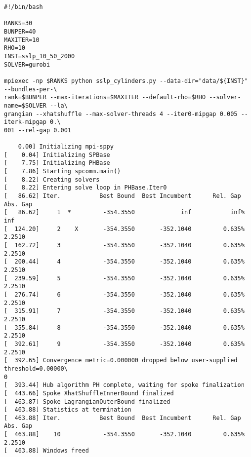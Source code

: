 \documentclass{article}
\begin{document}
\begin{verbatim}
#!/bin/bash

RANKS=30
BUNPER=40
MAXITER=10
RHO=10
INST=sslp_10_50_2000
SOLVER=gurobi

mpiexec -np $RANKS python sslp_cylinders.py --data-dir="data/${INST}" --bundles-per-\
rank=$BUNPER --max-iterations=$MAXITER --default-rho=$RHO --solver-name=$SOLVER --la\
grangian --xhatshuffle --max-solver-threads 4 --iter0-mipgap 0.005 --iterk-mipgap 0.\
001 --rel-gap 0.001

    0.00] Initializing mpi-sppy
[    0.04] Initializing SPBase
[    7.75] Initializing PHBase
[    7.86] Starting spcomm.main()
[    8.22] Creating solvers
[    8.22] Entering solve loop in PHBase.Iter0
[   86.62] Iter.           Best Bound  Best Incumbent      Rel. Gap        Abs. Gap
[   86.62]     1  *         -354.3550             inf           inf%             inf
[  124.20]     2    X       -354.3550       -352.1040         0.635%          2.2510
[  162.72]     3            -354.3550       -352.1040         0.635%          2.2510
[  200.44]     4            -354.3550       -352.1040         0.635%          2.2510
[  239.59]     5            -354.3550       -352.1040         0.635%          2.2510
[  276.74]     6            -354.3550       -352.1040         0.635%          2.2510
[  315.91]     7            -354.3550       -352.1040         0.635%          2.2510
[  355.84]     8            -354.3550       -352.1040         0.635%          2.2510
[  392.61]     9            -354.3550       -352.1040         0.635%          2.2510
[  392.65] Convergence metric=0.000000 dropped below user-supplied threshold=0.00000\
0
[  393.44] Hub algorithm PH complete, waiting for spoke finalization
[  443.66] Spoke XhatShuffleInnerBound finalized
[  463.87] Spoke LagrangianOuterBound finalized
[  463.88] Statistics at termination
[  463.88] Iter.           Best Bound  Best Incumbent      Rel. Gap        Abs. Gap
[  463.88]    10            -354.3550       -352.1040         0.635%          2.2510
[  463.88] Windows freed
\end{verbatim}
\end{document}
